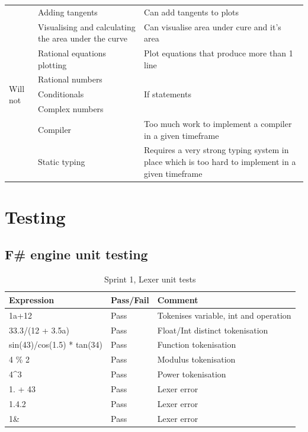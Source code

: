 \documentclass[a4paper, oneside, 11pt]{report}
\begin{document}
\begin{table}[h]
{\begin{center}
\begin{tabular}{|p{1in}|p{2in}|p{2.5in}|}
& Adding tangents & Can add tangents to plots \\ \cline{2-3}
& Visualising and calculating the area under the curve & Can visualise area under cure and it's area \\ \cline{2-3}
& Rational equations plotting & Plot equations that produce more than 1 line \\ \hline \hline
\multirow{3}{1in}{Will not}
& Rational numbers & \\ \cline{2-3}
& Conditionals & If statements \\ \cline{2-3}
& Complex numbers & \\ \cline{2-3}
& Compiler & Too much work to implement a compiler in a given timeframe \\ \cline{2-3}
& Static typing & Requires a very strong typing system in place which is too hard to implement in a given timeframe \\ \hline
\end{tabular}
\label{Table1}
\end{center}
}
\end{table}

\chapter{Testing}
\label{app:test}

\section{F\# engine unit testing}

\begin{table}[h]
\caption{Sprint 1, Lexer unit tests}
\label{sprint1-lexer-test}
\begin{tabular}{|l|l|l|}
\hline
\textbf{Expression}        & \textbf{Pass/Fail} & \textbf{Comment}                      \\ \hline
1a+12                      & Pass               & Tokenises variable, int and operation \\ \hline
33.3/(12 + 3.5a)           & Pass               & Float/Int distinct tokenisation       \\ \hline
sin(43)/cos(1.5) * tan(34) & Pass               & Function tokenisation                 \\ \hline
4 \% 2                     & Pass               & Modulus tokenisation                  \\ \hline
4\textasciicircum{}3       & Pass               & Power tokenisation                    \\ \hline
1. + 43                    & Pass               & Lexer error                           \\ \hline
1.4.2                      & Pass               & Lexer error                           \\ \hline
1\&                        & Pass               & Lexer error                           \\ \hline
\end{tabular}
\end{table}
\end{document}
